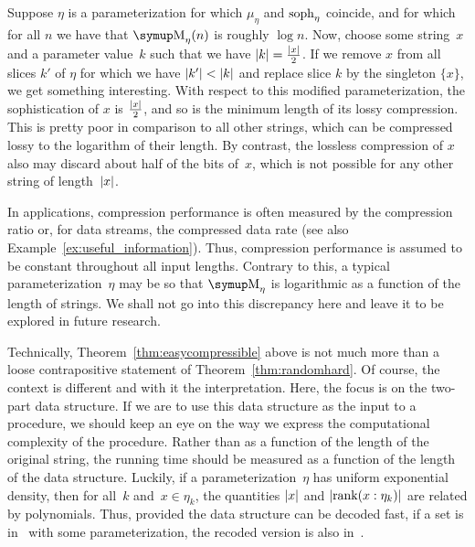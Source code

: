 \begin{example}
  Suppose $\eta$ is a parameterization for which $\mu_\eta$ and $\operatorname{soph}_\eta$ coincide, and for which for all $n$ we have that $\upM_\eta(n)$ is roughly $\log n$.
  Now, choose some string~$x$ and a parameter value~$k$ such that we have ${\lvert k\rvert} = \frac{{\lvert x\rvert}}{2}$.
  If we remove $x$ from all slices $k'$ of $\eta$ for which we have ${\lvert k'\rvert} < {\lvert k\rvert}$ and replace slice $k$ by the singleton $\{x\}$, we get something interesting.
  With respect to this modified parameterization, the sophistication of $x$ is $\frac{{\lvert x\rvert}}{2}$, and so is the minimum length of its lossy compression.
  This is pretty poor in comparison to all other strings, which can be compressed lossy to the logarithm of their length.
  By contrast, the lossless compression of $x$ also may discard about half of the bits of~$x$, which is not possible for any other string of length~${\lvert x\rvert}$.
\end{example}

In applications, compression performance is often measured by the compression ratio or, for data streams, the compressed data rate \parencite{sayood2017introduction,sneyers2016flif} (see also Example~\ref{ex:useful_information}).
Thus, compression performance is assumed to be constant throughout all input lengths.
Contrary to this, a typical parameterization~$\eta$ may be so that $\upM_\eta$ is logarithmic as a function of the length of strings.
We shall not go into this discrepancy here and leave it to be explored in future research.

Technically, Theorem~\ref{thm:easycompressible} above is not much more than a loose contrapositive statement of Theorem~\ref{thm:randomhard}.
Of course, the context is different and with it the interpretation.
Here, the focus is on the two-part data structure.
If we are to use this data structure as the input to a procedure, we should keep an eye on the way we express the computational complexity of the procedure.
Rather than as a function of the length of the original string, the running time should be measured as a function of the length of the data structure.
Luckily, if a parameterization~$\eta$ has uniform exponential density, then for all~$k$ and~$x \in \eta_k$, the quantities ${\lvert x\rvert}$ and ${\lvert\operatorname{rank}(x : \eta_k)\rvert}$ are related by polynomials.
Thus, provided the data structure can be decoded fast, if a set is in~ with some parameterization, the recoded version is also in~.

